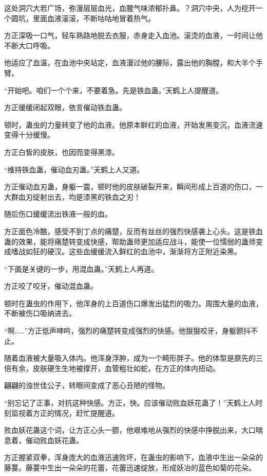 
\begin{this_body}



这处洞穴大若广场，弥漫层层血光，血腥气味浓郁扑鼻。？洞穴中央，人为挖开一个圆坑，里面血液滚滚，不断咕咕地冒着热气。

方正深吸一口气，轻车熟路地脱去衣服，赤身走入血池。滚烫的血液，一时间让他不断大口呼吸。

他适应了血温，在血池中央站定，血液漫过他的腰际，露出他的胸膛，和大半个手臂。

“开始吧。咱们一个个来，不要着急。先是铁血蛊。”天鹤上人提醒道。

方正缓缓闭起双眼，依言催动铁血蛊。

顿时，蛊虫的力量转变了他的血液。他原本鲜红的血液，开始发黑变沉，血液流速变得十分缓慢。

方正白皙的皮肤，也因而变得黑漆。

“维持铁血蛊，催动血刃蛊。”天鹤上人又道。

方正催动血刃蛊，身躯一震，顿时他的皮肤破裂开来，瞬间形成上百道的伤口，一大群血刃绽射出去，均是漆黑的铁血之刃！

随后伤口缓缓流出铁液一般的血。

方正面色冷酷，感受不到丁点的痛楚，反而有丝丝的强烈快感袭上心头。这是铁血蛊的效果，能将痛楚转变成快感，帮助蛊师更加适应战斗，能使一位懦弱的蛊师变成嗜战如狂的硬汉。这些血缓缓流入鲜红的血池中，渐渐将方正附近染黑。

“下面是关键的一步，用混血蛊。”天鹤上人再道。

方正咬了咬牙，催动混血蛊。

顿时在蛊虫的作用下，他浑身的上百道伤口爆发出猛烈的吸力。周围大量的血液，不断被伤口吸纳进去。

“啊……”方正低声呻吟，强烈的痛楚转变成强烈的快感。他狠狠咬牙，身躯颤抖不止。

随着血液被大量吸入体内。他浑身浮肿，成为一个畸形胖子。他的体型是原先的三倍有余，皮肤硬生生地被撑开，血管粗壮如蛇，在方正的体内扭动。

翩翩的浊世佳公子，转眼间变成了恶心丑陋的怪物。

“别忘记了正事，对抗这种快感。方正，快。应该催动败血妖花蛊了！”天鹤上人时刻监视着方正的情况，赶忙提醒道。

败血妖花蛊这个词，让方正心头一颤，他艰难地从强烈的快感中挣脱出来，大口喘息着，催动败血妖花蛊。

方正握紧双拳，浑身庞大的血液迅速败坏，在蛊虫的影响下，血液中生出一朵朵的藤蔓。藤蔓中生出一朵朵的花蕾，花蕾迅速绽放，形成妖冶的蓝色如菊的花朵。


\end{this_body}
